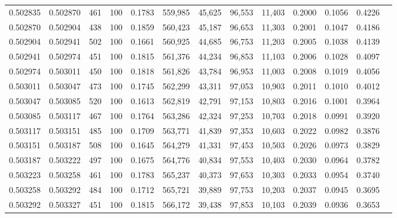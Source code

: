 \begin{tabular}{rrrrrrrrrrrrr}
0.502835 & 0.502870 &   461 & 100 &                                     0.1783 & 559,985 &  45,625 &  96,553 &  11,403 & 0.2000 & 0.1056 & 0.4226 \\
0.502870 & 0.502904 &   438 & 100 &                                     0.1859 & 560,423 &  45,187 &  96,653 &  11,303 & 0.2001 & 0.1047 & 0.4186 \\
0.502904 & 0.502941 &   502 & 100 &                                     0.1661 & 560,925 &  44,685 &  96,753 &  11,203 & 0.2005 & 0.1038 & 0.4139 \\
0.502941 & 0.502974 &   451 & 100 &                                     0.1815 & 561,376 &  44,234 &  96,853 &  11,103 & 0.2006 & 0.1028 & 0.4097 \\
0.502974 & 0.503011 &   450 & 100 &                                     0.1818 & 561,826 &  43,784 &  96,953 &  11,003 & 0.2008 & 0.1019 & 0.4056 \\
0.503011 & 0.503047 &   473 & 100 &                                     0.1745 & 562,299 &  43,311 &  97,053 &  10,903 & 0.2011 & 0.1010 & 0.4012 \\
0.503047 & 0.503085 &   520 & 100 &                                     0.1613 & 562,819 &  42,791 &  97,153 &  10,803 & 0.2016 & 0.1001 & 0.3964 \\
0.503085 & 0.503117 &   467 & 100 &                                     0.1764 & 563,286 &  42,324 &  97,253 &  10,703 & 0.2018 & 0.0991 & 0.3920 \\
0.503117 & 0.503151 &   485 & 100 &                                     0.1709 & 563,771 &  41,839 &  97,353 &  10,603 & 0.2022 & 0.0982 & 0.3876 \\
0.503151 & 0.503187 &   508 & 100 &                                     0.1645 & 564,279 &  41,331 &  97,453 &  10,503 & 0.2026 & 0.0973 & 0.3829 \\
0.503187 & 0.503222 &   497 & 100 &                                     0.1675 & 564,776 &  40,834 &  97,553 &  10,403 & 0.2030 & 0.0964 & 0.3782 \\
0.503223 & 0.503258 &   461 & 100 &                                     0.1783 & 565,237 &  40,373 &  97,653 &  10,303 & 0.2033 & 0.0954 & 0.3740 \\
0.503258 & 0.503292 &   484 & 100 &                                     0.1712 & 565,721 &  39,889 &  97,753 &  10,203 & 0.2037 & 0.0945 & 0.3695 \\
0.503292 & 0.503327 &   451 & 100 &                                     0.1815 & 566,172 &  39,438 &  97,853 &  10,103 & 0.2039 & 0.0936 & 0.3653 \\

\end{tabular}
